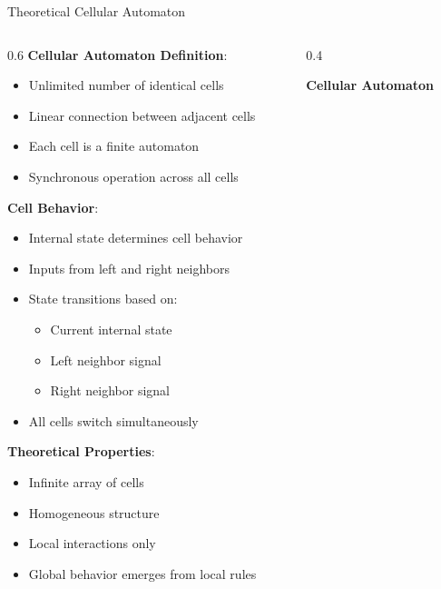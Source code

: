 \documentclass[aspectratio=169]{beamer}
\newcommand{\concept}[1]{\textbf{\color{darkblue}#1}}
\begin{document}
\begin{frame}{Theoretical Cellular Automaton}
\begin{columns}
\begin{column}{0.6\textwidth}
\concept{Cellular Automaton Definition}:
\begin{itemize}
\item Unlimited number of identical cells
\item Linear connection between adjacent cells
\item Each cell is a finite automaton
\item Synchronous operation across all cells
\end{itemize}

\vspace{0.3cm}
\concept{Cell Behavior}:
\begin{itemize}
\item Internal state determines cell behavior
\item Inputs from left and right neighbors
\item State transitions based on:
\begin{itemize}
\item Current internal state
\item Left neighbor signal
\item Right neighbor signal
\end{itemize}
\item All cells switch simultaneously
\end{itemize}

\vspace{0.3cm}
\concept{Theoretical Properties}:
\begin{itemize}
\item Infinite array of cells
\item Homogeneous structure
\item Local interactions only
\item Global behavior emerges from local rules
\end{itemize}
\end{column}
\begin{column}{0.4\textwidth}
\begin{center}
\textbf{Cellular Automaton}
\vspace{0.3cm}

\end{center}
\end{column}
\end{columns}
\end{frame}
\end{document}
